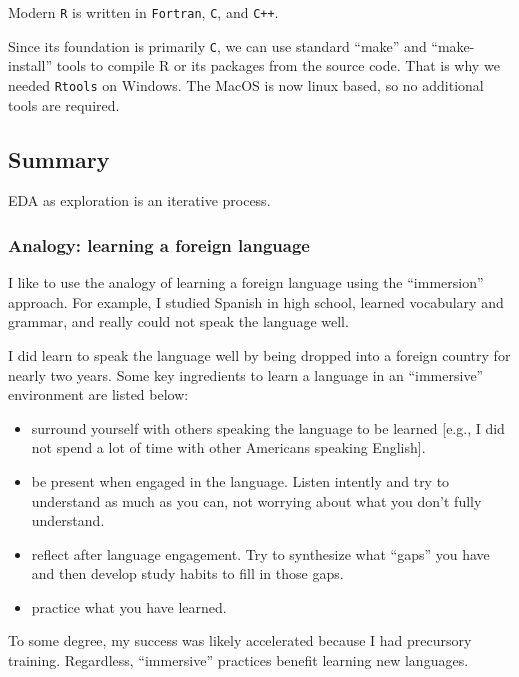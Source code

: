 \documentclass[
]{article}
\begin{document}
Modern \texttt{R} is written in \texttt{Fortran}, \texttt{C}, and
\texttt{C++}.

Since its foundation is primarily \texttt{C}, we can use standard
``make'' and ``make-install'' tools to compile R or its packages from
the source code. That is why we needed \texttt{Rtools} on Windows. The
MacOS is now linux based, so no additional tools are required.

\hypertarget{summary}{%
\subsection{Summary}\label{summary}}

EDA as exploration is an iterative process.

\hypertarget{analogy-learning-a-foreign-language}{%
\subsubsection{Analogy: learning a foreign
language}\label{analogy-learning-a-foreign-language}}

I like to use the analogy of learning a foreign language using the
``immersion'' approach. For example, I studied Spanish in high school,
learned vocabulary and grammar, and really could not speak the language
well.

I did learn to speak the language well by being dropped into a foreign
country for nearly two years. Some key ingredients to learn a language
in an ``immersive'' environment are listed below:

\begin{itemize}
\item
  surround yourself with others speaking the language to be learned
  {[}e.g., I did not spend a lot of time with other Americans speaking
  English{]}.
\item
  be present when engaged in the language. Listen intently and try to
  understand as much as you can, not worrying about what you don't fully
  understand.
\item
  reflect after language engagement. Try to synthesize what ``gaps'' you
  have and then develop study habits to fill in those gaps.
\item
  practice what you have learned.
\end{itemize}

To some degree, my success was likely accelerated because I had
precursory training. Regardless, ``immersive'' practices benefit
learning new languages.
\end{document}
